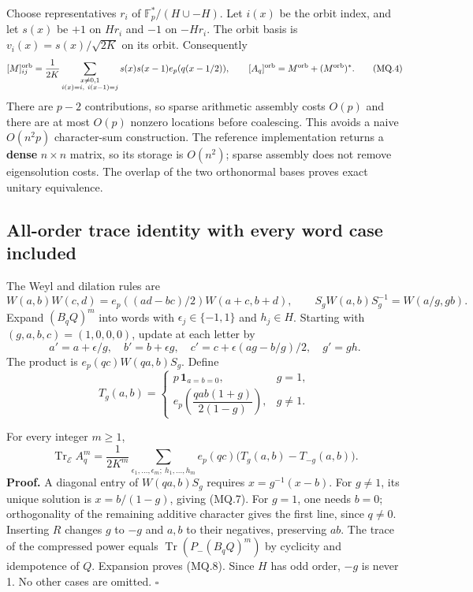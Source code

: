 Choose representatives \(r_i\) of \(\mathbb F_p^*/(H\cup-H)\). Let \(i(x)\) be the orbit index, and let \(s(x)\) be \(+1\) on \(Hr_i\) and \(-1\) on \(-Hr_i\). The orbit basis is \(v_i(x)=s(x)/\sqrt{2K}\) on its orbit. Consequently \[
 [M]^{\rm orb}_{ij}=\frac1{2K}
 \sum_{\substack{x\ne0,1\\i(x)=i,\ i(x-1)=j}}
 s(x)s(x-1)e_p(q(x-1/2)),\qquad
 [A_q]^{\rm orb}=M^{\rm orb}+(M^{\rm orb})^*. \tag{MQ.4}
\] There are \(p-2\) contributions, so sparse arithmetic assembly costs \(O(p)\) and there are at most \(O(p)\) nonzero locations before coalescing. This avoids a naive \(O(n^2p)\) character-sum construction. The reference implementation returns a \textbf{dense} \(n\times n\) matrix, so its storage is \(O(n^2)\); sparse assembly does not remove eigensolution costs. The overlap of the two orthonormal bases proves exact unitary equivalence.

\subsection{All-order trace identity with every word case included}\label{magnetic:all-order-trace-identity-with-every-word-case-included}

The Weyl and dilation rules are \[
 W(a,b)W(c,d)=e_p((ad-bc)/2)W(a+c,b+d),\qquad
 S_gW(a,b)S_g^{-1}=W(a/g,gb). \tag{MQ.5}
\] Expand \((B_qQ)^m\) into words with \(\epsilon_j\in\{-1,1\}\) and \(h_j\in H\). Starting with \((g,a,b,c)=(1,0,0,0)\), update at each letter by \[
 a'=a+\epsilon/g,\quad b'=b+\epsilon g,\quad
 c'=c+\epsilon(ag-b/g)/2,\quad g'=gh. \tag{MQ.6}
\] The product is \(e_p(qc)W(qa,b)S_g\). Define \[
 T_g(a,b)=
 \begin{cases}
 p\,\mathbf1_{a=b=0},&g=1,\\
 e_p\!\left(\dfrac{qab(1+g)}{2(1-g)}\right),&g\ne1.
 \end{cases} \tag{MQ.7}
\]
\begin{proposition}\label{pass1:magnetic-2} For every integer \(m\geq1\), \[
 \operatorname{Tr}_{\mathcal E}A_q^m
 =\frac1{2K^m}\sum_{\epsilon_1,\ldots,\epsilon_m;\ h_1,\ldots,h_m}
   e_p(qc)\bigl(T_g(a,b)-T_{-g}(a,b)\bigr). \tag{MQ.8}
\] \textbf{Proof.} A diagonal entry of \(W(qa,b)S_g\) requires \(x=g^{-1}(x-b)\). For \(g\ne1\), its unique solution is \(x=b/(1-g)\), giving (MQ.7). For \(g=1\), one needs \(b=0\); orthogonality of the remaining additive character gives the first line, since \(q\ne0\). Inserting \(R\) changes \(g\) to \(-g\) and \(a,b\) to their negatives, preserving \(ab\). The trace of the compressed power equals \(\operatorname{Tr}(P_-(B_qQ)^m)\) by cyclicity and idempotence of \(Q\). Expansion proves (MQ.8). Since \(H\) has odd order, \(-g\) is never 1. No other cases are omitted. \(\square\)
\end{proposition}

